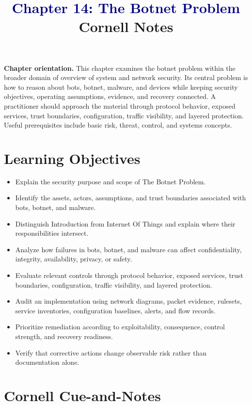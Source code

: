 \documentclass[11pt]{article}
\title{\textcolor{Navy}{Chapter 14: The Botnet Problem}\\[2mm]\large Cornell Notes}
\author{}
\date{}
\begin{document}
\maketitle
\thispagestyle{fancy}
\vspace{-1.5em}
\begin{orientationbox}
\textbf{Chapter orientation.} This chapter examines the botnet problem within the broader domain of overview of system and network security. Its central problem is how to reason about bots, botnet, malware, and devices while keeping security objectives, operating assumptions, evidence, and recovery connected. A practitioner should approach the material through protocol behavior, exposed services, trust boundaries, configuration, traffic visibility, and layered protection. Useful prerequisites include basic risk, threat, control, and systems concepts.
\end{orientationbox}
\section*{Learning Objectives}
\begin{itemize}
\item Explain the security purpose and scope of The Botnet Problem.
\item Identify the assets, actors, assumptions, and trust boundaries associated with bots, botnet, and malware.
\item Distinguish Introduction from Internet Of Things and explain where their responsibilities intersect.
\item Analyze how failures in bots, botnet, and malware can affect confidentiality, integrity, availability, privacy, or safety.
\item Evaluate relevant controls through protocol behavior, exposed services, trust boundaries, configuration, traffic visibility, and layered protection.
\item Audit an implementation using network diagrams, packet evidence, rulesets, service inventories, configuration baselines, alerts, and flow records.
\item Prioritize remediation according to exploitability, consequence, control strength, and recovery readiness.
\item Verify that corrective actions change observable risk rather than documentation alone.
\end{itemize}
\section*{Cornell Cue-and-Notes}
\end{document}
